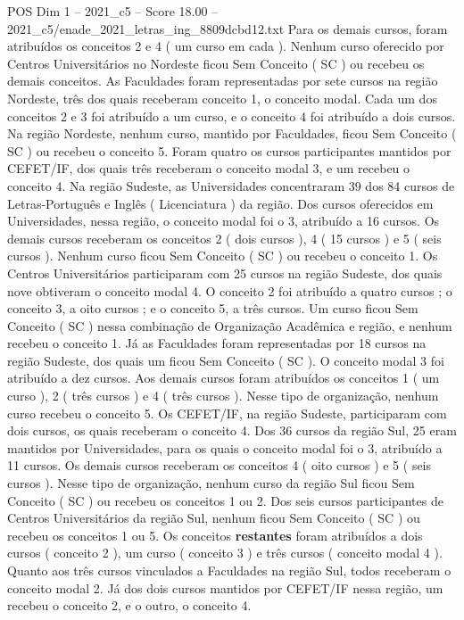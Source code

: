 \begin{textsample}{POS Dim 1 – 2021\_c5 – Score 18.00 – 2021\_c5/enade\_2021\_letras\_ing\_8809dcbd12.txt}
Para os demais cursos, foram atribuídos os conceitos 2 e 4 ( um curso em cada ).
Nenhum curso oferecido por Centros Universitários no Nordeste ficou Sem Conceito ( SC ) ou recebeu os demais conceitos.
As Faculdades foram representadas por sete cursos na região Nordeste, três dos quais receberam conceito 1, o conceito modal.
Cada um dos conceitos 2 e 3 foi atribuído a um curso, e o conceito 4 foi atribuído a dois cursos.
Na região Nordeste, nenhum curso, mantido por Faculdades, ficou Sem Conceito ( SC ) ou recebeu o conceito 5.
Foram quatro os cursos participantes mantidos por CEFET/IF, dos quais três receberam o conceito modal 3, e um recebeu o conceito 4.
Na região Sudeste, as Universidades concentraram 39 dos 84 cursos de Letras-Português e Inglês ( Licenciatura ) da região.
Dos cursos oferecidos em Universidades, nessa região, o conceito modal foi o 3, atribuído a 16 cursos.
Os demais cursos receberam os conceitos 2 ( dois cursos ), 4 ( 15 cursos ) e 5 ( seis cursos ).
Nenhum curso ficou Sem Conceito ( SC ) ou recebeu o conceito 1.
Os Centros Universitários participaram com 25 cursos na região Sudeste, dos quais nove obtiveram o conceito modal 4.
O conceito 2 foi atribuído a quatro cursos ; o conceito 3, a oito cursos ; e o conceito 5, a três cursos.
Um curso ficou Sem Conceito ( SC ) nessa combinação de Organização Acadêmica e região, e nenhum recebeu o conceito 1.
Já as Faculdades foram representadas por 18 cursos na região Sudeste, dos quais um ficou Sem Conceito ( SC ).
O conceito modal 3 foi atribuído a dez cursos.
Aos demais cursos foram atribuídos os conceitos 1 ( um curso ), 2 ( três cursos ) e 4 ( três cursos ).
Nesse tipo de organização, nenhum curso recebeu o conceito 5.
Os CEFET/IF, na região Sudeste, participaram com dois cursos, os quais receberam o conceito 4.
Dos 36 cursos da região Sul, 25 eram mantidos por Universidades, para os quais o conceito modal foi o 3, atribuído a 11 cursos.
Os demais cursos receberam os conceitos 4 ( oito cursos ) e 5 ( seis cursos ).
Nesse tipo de organização, nenhum curso da região Sul ficou Sem Conceito ( SC ) ou recebeu os conceitos 1 ou 2.
Dos seis cursos participantes de Centros Universitários da região Sul, nenhum ficou Sem Conceito ( SC ) ou recebeu os conceitos 1 ou 5.
Os conceitos \textbf{restantes} foram atribuídos a dois cursos ( conceito 2 ), um curso ( conceito 3 ) e três cursos ( conceito modal 4 ).
Quanto aos três cursos vinculados a Faculdades na região Sul, todos receberam o conceito modal 2.
Já dos dois cursos mantidos por CEFET/IF nessa região, um recebeu o conceito 2, e o outro, o conceito 4.

\end{textsample}
